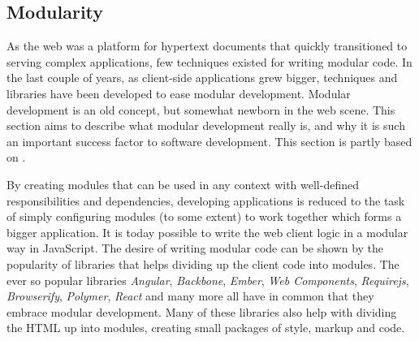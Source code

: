 \documentclass[a4paper,11pt]{kth-mag}
\begin{document}
      \subsection{Modularity}\label{sec:modularity}
        As the \gls{web} was a platform for \gls{hypertext} \glspl{document} that quickly transitioned to serving complex applications, few techniques existed for writing modular code.
        In the last couple of years, as client-side applications grew bigger, techniques and libraries have been developed to ease modular development.
        Modular development is an old concept, but somewhat newborn in the \gls{web} scene.
        This section aims to describe what modular development really is, and why it is such an important success factor to software development.
        This section is partly based on .

        By creating modules that can be used in any context with well-defined responsibilities and dependencies, developing applications is reduced to the task of simply configuring modules (to some extent) to work together which forms a bigger application.
        It is today possible to write the \gls{web} client logic in a modular way in \gls{JavaScript}.
        The desire of writing modular code can be shown by the popularity of libraries that helps dividing up the client code into modules.
        The ever so popular libraries \emph{Angular}, \emph{Backbone}, \emph{Ember}, \emph{Web Components}, \emph{Requirejs}, \emph{Browserify}, \emph{Polymer}, \emph{React} and many more all have in common that they embrace modular development.
        Many of these libraries also help with dividing the \gls{HTML} up into modules, creating small packages of style, markup and code.
\end{document}
